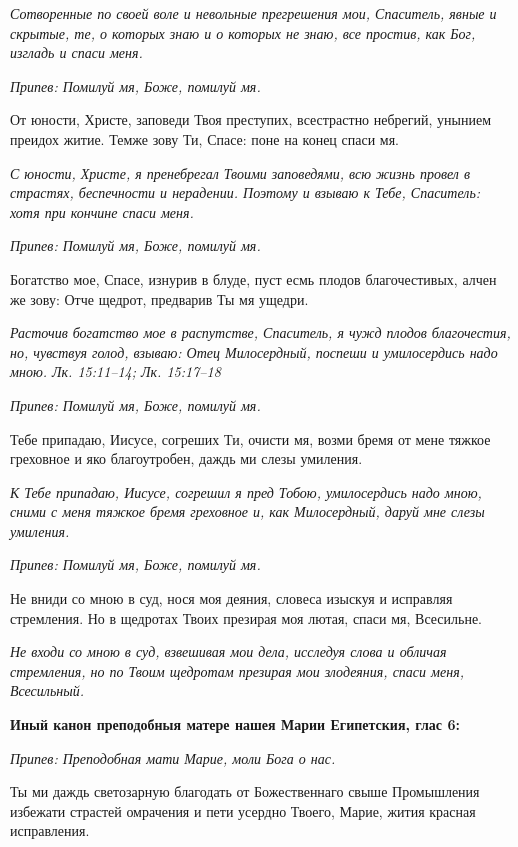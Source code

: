 \itshape Сотворенные по своей воле и невольные прегрешения мои, Спаситель, явные и скрытые, те, о которых знаю и о которых не знаю, все простив, как Бог, изгладь и спаси меня.\normalfont{}


\itshape Припев:\normalfont{} Помилуй мя, Боже, помилуй мя.


От юности, Христе, заповеди Твоя преступих, всестрастно небрегий, унынием преидох житие. Темже зову Ти, Спасе: поне на конец спаси мя.


\itshape С юности, Христе, я пренебрегал Твоими заповедями, всю жизнь провел в страстях, беспечности и нерадении. Поэтому и взываю к Тебе, Спаситель: хотя при кончине спаси меня.\normalfont{}


\itshape Припев:\normalfont{} Помилуй мя, Боже, помилуй мя.


Богатство мое, Спасе, изнурив в блуде, пуст есмь плодов благочестивых, алчен же зову: Отче щедрот, предварив Ты мя ущедри.


\itshape Расточив богатство мое в распутстве, Спаситель, я чужд плодов благочестия, но, чувствуя голод, взываю: Отец Милосердный, поспеши и умилосердись надо мною. Лк. 15:11–14; Лк. 15:17–18\normalfont{}


\itshape Припев:\normalfont{} Помилуй мя, Боже, помилуй мя.


Тебе припадаю, Иисусе, согреших Ти, очисти мя, возми бремя от мене тяжкое греховное и яко благоутробен, даждь ми слезы умиления.


\itshape К Тебе припадаю, Иисусе, согрешил я пред Тобою, умилосердись надо мною, сними с меня тяжкое бремя греховное и, как Милосердный, даруй мне слезы умиления.\normalfont{}


\itshape Припев:\normalfont{} Помилуй мя, Боже, помилуй мя.


Не вниди со мною в суд, нося моя деяния, словеса изыскуя и исправляя стремления. Но в щедротах Твоих презирая моя лютая, спаси мя, Всесильне.


\itshape Не входи со мною в суд, взвешивая мои дела, исследуя слова и обличая стремления, но по Твоим щедротам презирая мои злодеяния, спаси меня, Всесильный.\normalfont{}





\bfseries Иный канон преподобныя матере нашея Марии Египетския, глас 6:\normalfont{}


\itshape Припев:\normalfont{} Преподобная мати Марие, моли Бога о нас.


Ты ми даждь светозарную благодать от Божественнаго свыше Промышления избежати страстей омрачения и пети усердно Твоего, Марие, жития красная исправления.


